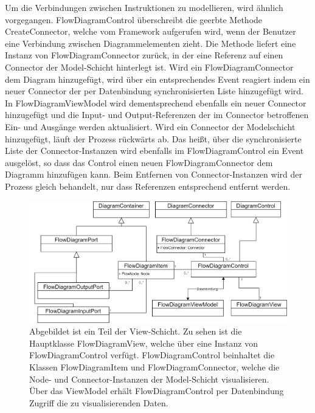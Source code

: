 \newline
Um die Verbindungen zwischen Instruktionen zu modellieren, wird ähnlich vorgegangen. FlowDiagramControl überschreibt die geerbte Methode CreateConnector, welche vom Framework aufgerufen wird, wenn der Benutzer eine Verbindung zwischen Diagrammelementen zieht. Die Methode liefert eine Instanz von FlowDiagramConnector zurück, in der eine Referenz auf einen Connector der Model-Schicht hinterlegt ist. Wird ein FlowDiagramConnector dem Diagram hinzugefügt, wird über ein entsprechendes Event reagiert indem ein neuer Connector der per Datenbindung synchronisierten Liste hinzugefügt wird. In FlowDiagramViewModel wird dementsprechend ebenfalls ein neuer Connector hinzugefügt und die Input- und Output-Referenzen der im Connector betroffenen Ein- und Ausgänge werden aktualisiert. Wird ein Connector der Modelschicht hinzugefügt, läuft der Prozess rückwärts ab. Das heißt, über die synchronisierte Liste der Connector-Instanzen wird ebenfalls im FlowDiagramControl ein Event ausgelöst, so dass das Control einen neuen FlowDiagramConnector dem Diagramm hinzufügen kann. Beim Entfernen von Connector-Instanzen wird der Prozess gleich behandelt, nur dass Referenzen entsprechend entfernt werden.      

\begin{figure} %
	\centering
		\includegraphics[width=\textwidth]{img/FlowViewUML.png}
	\caption[Klassenstruktur der View-Schicht]{Abgebildet ist ein Teil der View-Schicht. Zu sehen ist die Hauptklasse FlowDiagramView, welche über eine Instanz von FlowDiagramControl verfügt. FlowDiagramControl beinhaltet die Klassen FlowDiagramItem und FlowDiagramConnector, welche die Node- und Connector-Instanzen der Model-Schicht visualisieren. Über das ViewModel erhält FlowDiagramControl per Datenbindung Zugriff die zu visualisierenden Daten.}
	\label{fig:UML:FlowView}
\end{figure}


